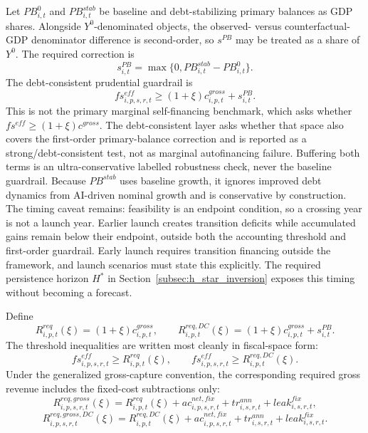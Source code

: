 \documentclass[11pt,a4paper]{article}
\begin{document}
Let $PB^0_{i,t}$ and $PB^{stab}_{i,t}$ be baseline and debt-stabilizing primary balances as GDP shares. Alongside $Y^0$-denominated objects, the observed- versus counterfactual-GDP denominator difference is second-order, so $s^{PB}$ may be treated as a share of $Y^0$. The required correction is
\begin{equation}\label{eq:spb_main_v10}
    s^{PB}_{i,t}=\max\{0,PB^{stab}_{i,t}-PB^0_{i,t}\}.
\end{equation}
The debt-consistent prudential guardrail is
\begin{equation}\label{eq:debt_requirement_main_v10}
    fs^{eff}_{i,p,s,r,t}\geq (1+\xi)c^{gross}_{i,p,t}+s^{PB}_{i,t}.
\end{equation}
This is not the primary marginal self-financing benchmark, which asks whether $fs^{eff}\geq(1+\xi)c^{gross}$. The debt-consistent layer asks whether that space also covers the first-order primary-balance correction and is reported as a strong/debt-consistent test, not as marginal autofinancing failure. Buffering both terms is an ultra-conservative labelled robustness check, never the baseline guardrail.
Because $PB^{stab}$ uses baseline growth, it ignores improved debt dynamics from AI-driven nominal growth and is conservative by construction. The timing caveat remains: feasibility is an endpoint condition, so a crossing year is not a launch year. Earlier launch creates transition deficits while accumulated gains remain below their endpoint, outside both the accounting threshold and first-order guardrail. Early launch requires transition financing outside the framework, and launch scenarios must state this explicitly. The required persistence horizon $H^{*}$ in Section~\ref{subsec:h_star_inversion} exposes this timing without becoming a forecast.

Define
\begin{equation}\label{eq:Rreq_main_v10}
    R^{req}_{i,p,t}(\xi)=(1+\xi)c^{gross}_{i,p,t},
    \qquad
    R^{req,DC}_{i,p,t}(\xi)=(1+\xi)c^{gross}_{i,p,t}+s^{PB}_{i,t}.
\end{equation}
The threshold inequalities are written most cleanly in fiscal-space form:
\begin{equation}\label{eq:effective_thresholds_main_v10}
    fs^{eff}_{i,p,s,r,t}\geq R^{req}_{i,p,t}(\xi),
    \qquad
    fs^{eff}_{i,p,s,r,t}\geq R^{req,DC}_{i,p,t}(\xi).
\end{equation}
Under the generalized gross-capture convention, the corresponding required gross revenue includes the fixed-cost subtractions only:
\begin{equation}\label{eq:gross_req_main_v17}
    R^{req,gross}_{i,p,s,r,t}(\xi)=R^{req}_{i,p,t}(\xi)+ac^{net,fix}_{i,p,s,r,t}+tr^{ann}_{i,s,r,t}+leak^{fix}_{i,s,r,t},
\end{equation}
\begin{equation}\label{eq:gross_req_dc_main_v17}
    R^{req,gross,DC}_{i,p,s,r,t}(\xi)=R^{req,DC}_{i,p,t}(\xi)+ac^{net,fix}_{i,p,s,r,t}+tr^{ann}_{i,s,r,t}+leak^{fix}_{i,s,r,t}.
\end{equation}
\end{document}

